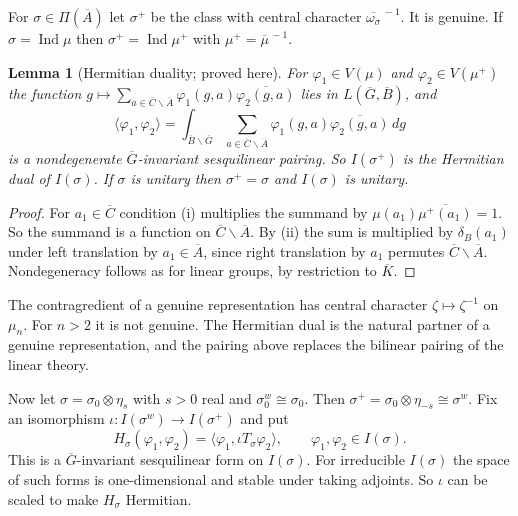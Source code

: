 \documentclass[12pt,letterpaper]{article}
\numberwithin{equation}{section}
\newtheorem{lemma}[theorem]{Lemma}
\theoremstyle{definition}
\newcommand{\proved}{proved here}
\newcommand{\bG}{\overline{G}}
\newcommand{\bA}{\overline{A}}
\newcommand{\bB}{\overline{B}}
\newcommand{\bC}{\overline{C}}
\newcommand{\bK}{\overline{K}}
\DeclareMathOperator{\Ind}{Ind}
\begin{document}
For $\sigma\in\Pi(\bA)$ let $\sigma^+$ be the class with central character
$\overline{\omega_\sigma}^{\,-1}$.  It is genuine.  If $\sigma=\Ind\mu$ then
$\sigma^+=\Ind\mu^+$ with $\mu^+=\overline\mu^{\,-1}$.

\begin{lemma}[Hermitian duality; \proved]\label{lem:hermitian}
For $\varphi_1\in V(\mu)$ and $\varphi_2\in V(\mu^+)$ the function
$g\mapsto\sum_{a\in\bC\backslash\bA}\varphi_1(g,a)\overline{\varphi_2(g,a)}$ lies in
$L(\bG,\bB)$, and
\[
\langle\varphi_1,\varphi_2\rangle=\int_{\bB\backslash\bG}\sum_{a\in\bC\backslash\bA}\varphi_1(g,a)\overline{\varphi_2(g,a)}\,dg
\]
is a nondegenerate $\bG$-invariant sesquilinear pairing.  So $I(\sigma^+)$ is the
Hermitian dual of $I(\sigma)$.  If $\sigma$ is unitary then $\sigma^+=\sigma$ and $I(\sigma)$
is unitary.
\end{lemma}
\begin{proof}
For $a_1\in\bC$ condition (i) multiplies the summand by $\mu(a_1)\overline{\mu^+(a_1)}=1$.
So the summand is a function on $\bC\backslash\bA$.  By (ii) the sum is multiplied by
$\delta_B(a_1)$ under left translation by $a_1\in\bA$, since right translation by $a_1$
permutes $\bC\backslash\bA$.  Nondegeneracy follows as for linear groups, by restriction to
$\bK$.
\end{proof}

The contragredient of a genuine representation has central character $\zeta\mapsto\zeta^{-1}$
on $\mu_n$.  For $n>2$ it is not genuine.  The Hermitian dual is the natural partner of a
genuine representation, and the pairing above replaces the bilinear pairing of the linear
theory.

Now let $\sigma=\sigma_0\otimes\eta_s$ with $s>0$ real and $\sigma_0^w\cong\sigma_0$.  Then
$\sigma^+=\sigma_0\otimes\eta_{-s}\cong\sigma^w$.  Fix an isomorphism
$\iota:I(\sigma^w)\to I(\sigma^+)$ and put
\begin{equation}\label{eq:H}
H_\sigma(\varphi_1,\varphi_2)=\langle\varphi_1,\iota T_\sigma\varphi_2\rangle,\qquad\varphi_1,\varphi_2\in I(\sigma).
\end{equation}
This is a $\bG$-invariant sesquilinear form on $I(\sigma)$.  For irreducible $I(\sigma)$ the
space of such forms is one-dimensional and stable under taking adjoints.  So $\iota$ can be
scaled to make $H_\sigma$ Hermitian.
\end{document}
